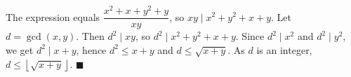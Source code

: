 The expression equals $\dfrac{x^2+x+y^2+y}{xy}$, so $xy\mid x^2+y^2+x+y$. Let $d=\gcd(x,y)$. Then $d^2\mid xy$, so $d^2\mid x^2+y^2+x+y$. Since $d^2\mid x^2$ and $d^2\mid y^2$, we get $d^2\mid x+y$, hence $d^2\le x+y$ and $d\le\sqrt{x+y}$. As $d$ is an integer, $d\le\left\lfloor\sqrt{x+y}\right\rfloor$. $\blacksquare$
